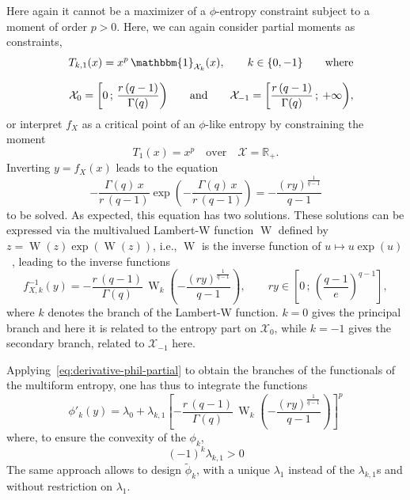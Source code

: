 \documentclass[entropy,article,submit,moreauthors,pdftex]{Definitions/mdpi}
\def\Rset{\mathbb{R}}%
\def\X{\mathcal{X}}%
\def\un{\mathbbm{1}}%
\def\W{\operatorname{W}} %
\begin{document}
Here again it cannot be a maximizer  of a $\phi$-entropy constraint subject to a
moment  of order  $p >  0$.   Here, we  can  again consider  partial moments  as
constraints,
%
\begin{eqnarray*}
&&  T_{k,1}(x) =  x^p  \,  \un_{\X_k}(x), \qquad  k  \in \{  0  ,  -1 \}  \qquad
  \mbox{where}   \\[2.5mm]  &&   \X_0   =  \left[   0  \,   ;   \,  \frac{r   \,
      (q-1)}{\Gamma(q)} \right) \qquad \mbox{and}  \qquad \X_{-1} = \left[
      \frac{r \, (q-1)}{\Gamma(q)} \, ; \: +\infty \right),
\end{eqnarray*}
%
or interpret $f_X$ as a critical point of an $\phi$-like entropy by constraining
the moment
%
\begin{equation}
T_1(x) = x^p \quad \mbox{over} \quad \X = \Rset_+.
\end{equation}
%
Inverting $y = f_X(x)$ leads to the equation
%
\[
- \frac{\Gamma(q)  \, x}{r  \, (q-1)}  \exp\left( -  \frac{\Gamma(q) \,  x}{r \,
  (q-1)} \right) = - \frac{\left( r y \right)^{\frac{1}{q-1}}}{q-1}
\]
%
to be solved. As expected, this  equation has two solutions. These solutions can
be expressed via  the multivalued Lambert-W function $\W$ defined  by $z = \W(z)
\exp(\W(z))$,   i.e.,  $\W$   is  the   inverse   function  of   $u  \mapsto   u
\exp(u)$~\cite[\S~1]{CorGon96}, leading to the inverse functions
%
\begin{equation}
f_{X,k}^{-1}(y) = - \frac{r \,  (q-1)}{\Gamma(q)} \, \W_k\left( - \frac{\left( r
  y \right)^{\frac{1}{q-1}}}{q-1}  \right) ,  \qquad r  y \in \left[  0 \,  ; \,
  \left( \frac{q-1}{e} \right)^{q-1} \right],
\end{equation}
%
where  $k$  denotes the  branch  of  the  Lambert-W  function. $k=0$  gives  the
principal branch and here it is related  to the entropy part on $\X_0$, while $k
= -1$ gives the secondary branch, related to $\X_{-1}$ here.

Applying~\eqref{eq:derivative-phil-partial}  to  obtain   the  branches  of  the
functionals of the multiform entropy, one has thus to integrate the functions
%
\[
\phi'_k(y) = \lambda_0 + \lambda_{k,1}  \left[ - \frac{r \, (q-1)}{\Gamma(q)} \,
  \W_k\left( - \frac{\left( r y \right)^{\frac{1}{q-1}}}{q-1} \right) \right]^p
\]
%
where, to ensure the convexity of the $\phi_k$,
%
\[
(-1)^k \lambda_{k,1} > 0
\]
%
The  same  approach  allows  to   design  $\widetilde{\phi}_k$,  with  a  unique
$\lambda_1$  instead   of  the  $\lambda_{k,1}$s  and   without  restriction  on
$\lambda_1$.
\end{document}
